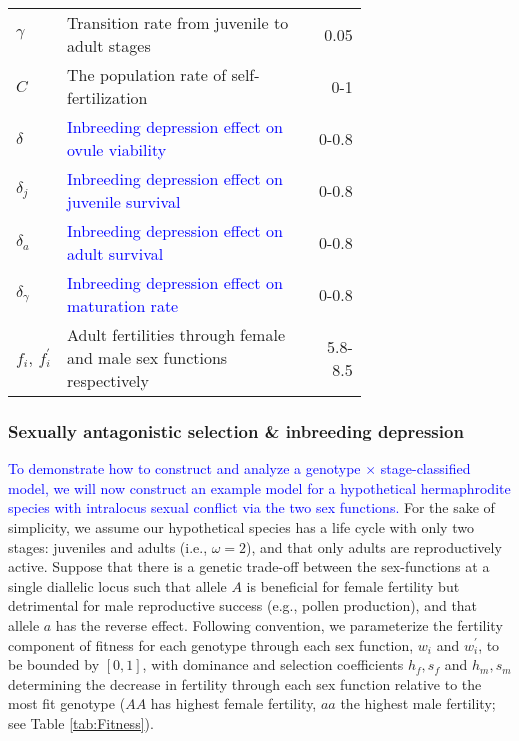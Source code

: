 \documentclass[11pt]{article}
\begin{document}
\begin{table}[htbp]
\begin{tabular}{ l p{0.7\linewidth} r }
$\gamma$ & Transition rate from juvenile to adult stages & 0.05\\
$C$ & The population rate of self-fertilization &0-1 \\
$\delta$ &\textcolor{blue}{ Inbreeding depression effect on ovule viability}&0-0.8\\
$ \delta_j$ & \textcolor{blue}{ Inbreeding depression effect on juvenile survival}& 0-0.8\\
$\delta_a$ & \textcolor{blue}{ Inbreeding depression effect on adult survival}& 0-0.8\\
$\delta_{\gamma}$ &\textcolor{blue}{Inbreeding depression effect on maturation rate} & 0-0.8\\
$f_i,\,f^{\prime}_i$ & Adult fertilities through female and male sex functions respectively & 5.8-8.5 \\

\hline
\end{tabular}
\end{table}
\newpage{}


\subsubsection*{Sexually antagonistic selection \& inbreeding depression} \label{sec:SAsel}

\textcolor{blue}{To demonstrate how to construct and analyze a genotype $\times$ stage-classified model, we will now construct an example model for a hypothetical hermaphrodite species with intralocus sexual conflict via the two sex functions. }For the sake of simplicity, we assume our hypothetical species has a life cycle with only two stages: juveniles and adults (i.e., $\omega = 2$), and that only adults are reproductively active. Suppose that there is a genetic trade-off between the sex-functions at a single diallelic locus such that allele $A$ is beneficial for female fertility but detrimental for male reproductive success (e.g., pollen production), and that allele $a$ has the reverse effect. Following convention, we parameterize the fertility component of fitness for each genotype through each sex function, $w_{i}$ and $w^{\prime}_{i}$, to be bounded by $[0,1]$, with dominance and selection coefficients $h_f, s_f$ and $h_m, s_m$ determining the decrease in fertility through each sex function relative to the most fit genotype ($AA$ has highest female fertility, $aa$ the highest male fertility; see Table \ref{tab:Fitness}). 
\end{document}
